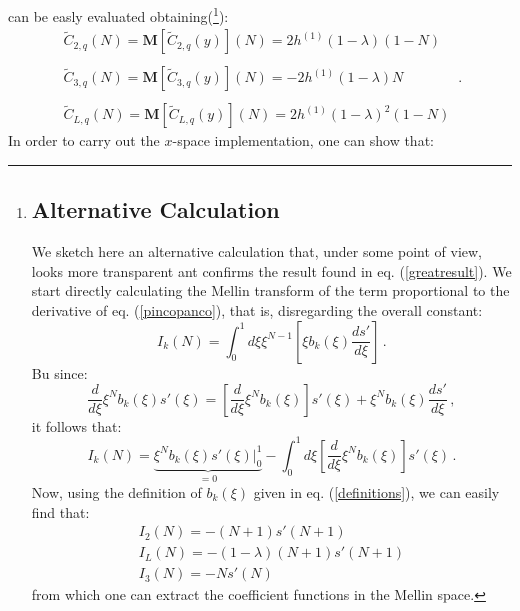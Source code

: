 \documentclass[10pt,a4paper]{article}
\begin{document}
can be easly evaluated obtaining(\footnote{
\subsection*{Alternative Calculation}
We sketch here an alternative calculation that, under some point of view, looks more transparent ant confirms the result found in eq. (\ref{greatresult}). We start directly calculating the Mellin transform of the term proportional to the derivative of eq. (\ref{pincopanco}), that is, disregarding the overall constant:
\begin{equation}
I_k(N)=\int_0^1d\xi \xi^{N-1}\left[\xi b_k(\xi)\frac{ds'}{d\xi}\right]\,.
\end{equation}
Bu since:
\begin{equation}
\frac{d}{d\xi}\xi^{N}b_k(\xi)s'(\xi)=\left[\frac{d}{d\xi}\xi^{N}b_k(\xi)\right]s'(\xi)+\xi^{N}b_k(\xi)\frac{ds'}{d\xi}\,,
\end{equation}
it follows that:
\begin{equation}
I_k(N)=\underbrace{\xi^{N}b_k(\xi)s'(\xi)\Big|_0^1}_{=0}-\int_0^1d\xi\left[\frac{d}{d\xi}\xi^{N}b_k(\xi)\right]s'(\xi)\,.
\end{equation}
Now, using the definition of $b_k(\xi)$ given in eq. (\ref{definitions}), we can easily find that:
\begin{equation}
\begin{array}{l}
\displaystyle I_2(N) = -(N+1)s'(N+1)\\
\displaystyle I_L(N) = -(1-\lambda)(N+1)s'(N+1)\\
\displaystyle I_3(N) = -Ns'(N)
\end{array}   
\end{equation}
from which one can extract the coefficient functions in the Mellin space.
}):
\begin{equation}\label{greatresult}
\begin{array}{l}
\displaystyle \widetilde{C}_{2,q}(N)=\mathbf{M}[\widetilde{C}_{2,q}(y)](N)=2h^{(1)}(1-\lambda)(1-N)\\
\\
\displaystyle \widetilde{C}_{3,q}(N)=\mathbf{M}[\widetilde{C}_{3,q}(y)](N)=-2h^{(1)}(1-\lambda)N\\
\\
\displaystyle \widetilde{C}_{L,q}(N)=\mathbf{M}[\widetilde{C}_{L,q}(y)](N)=2h^{(1)}(1-\lambda)^2(1-N)
\end{array}\,.
\end{equation}
In order to carry out the $x$-space implementation, one can show that:
\end{document}
